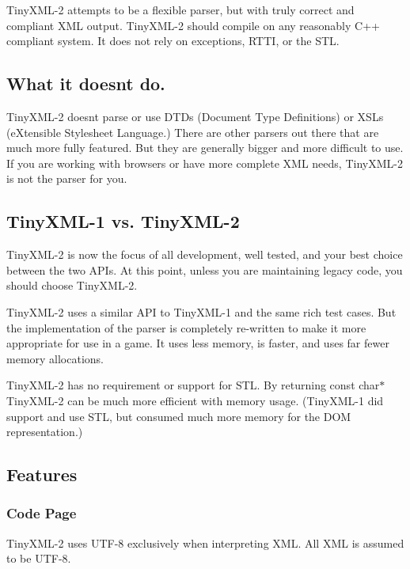 Tiny\+X\+M\+L-\/2 attempts to be a flexible parser, but with truly correct and compliant X\+ML output. Tiny\+X\+M\+L-\/2 should compile on any reasonably C++ compliant system. It does not rely on exceptions, R\+T\+TI, or the S\+TL.

\subsection*{What it doesn\textquotesingle{}t do. }

Tiny\+X\+M\+L-\/2 doesn\textquotesingle{}t parse or use D\+T\+Ds (Document Type Definitions) or X\+S\+Ls (e\+Xtensible Stylesheet Language.) There are other parsers out there that are much more fully featured. But they are generally bigger and more difficult to use. If you are working with browsers or have more complete X\+ML needs, Tiny\+X\+M\+L-\/2 is not the parser for you.

\subsection*{Tiny\+X\+M\+L-\/1 vs. Tiny\+X\+M\+L-\/2 }

Tiny\+X\+M\+L-\/2 is now the focus of all development, well tested, and your best choice between the two A\+P\+Is. At this point, unless you are maintaining legacy code, you should choose Tiny\+X\+M\+L-\/2.

Tiny\+X\+M\+L-\/2 uses a similar A\+PI to Tiny\+X\+M\+L-\/1 and the same rich test cases. But the implementation of the parser is completely re-\/written to make it more appropriate for use in a game. It uses less memory, is faster, and uses far fewer memory allocations.

Tiny\+X\+M\+L-\/2 has no requirement or support for S\+TL. By returning {\ttfamily const char$\ast$} Tiny\+X\+M\+L-\/2 can be much more efficient with memory usage. (Tiny\+X\+M\+L-\/1 did support and use S\+TL, but consumed much more memory for the D\+OM representation.)

\subsection*{Features }

\subsubsection*{Code Page}

Tiny\+X\+M\+L-\/2 uses U\+T\+F-\/8 exclusively when interpreting X\+ML. All X\+ML is assumed to be U\+T\+F-\/8.

